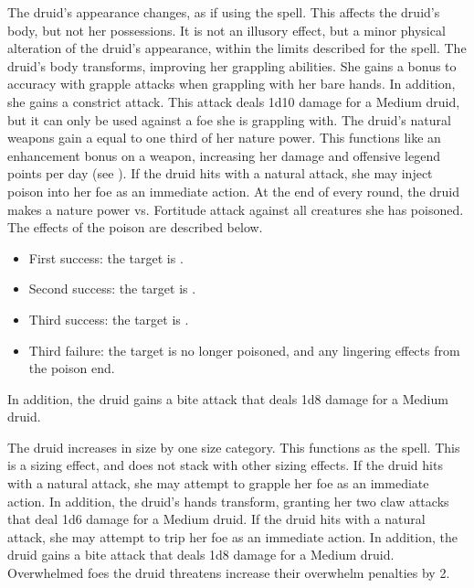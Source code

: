     The druid's appearance changes, as if using the  spell.
    This affects the druid's body, but not her possessions.
    It is not an illusory effect, but a minor physical alteration of the druid's appearance, within the limits described for the spell.
    The druid's body transforms, improving her grappling abilities.
    She gains a  bonus to accuracy with grapple attacks when grappling with her bare hands.
    In addition, she gains a constrict attack.
    This attack deals 1d10 damage for a Medium druid, but it can only be used against a foe she is grappling with.
    The druid's natural weapons gain a  equal to one third of her nature power.
    This functions like an enhancement bonus on a weapon, increasing her damage and offensive legend points per day (see ).
    If the druid hits with a natural attack, she may inject poison into her foe as an immediate action.
    At the end of every round, the druid makes a nature power vs. Fortitude attack against all creatures she has poisoned.
    The effects of the poison are described below.
    \begin{itemize}
        \item First success: the target is \sickened.
        \item Second success: the target is \staggered.
        \item Third success: the target is \nauseated.
        \item Third failure: the target is no longer poisoned, and any lingering effects from the poison end.
    \end{itemize}
    \par In addition, the druid gains a bite attack that deals 1d8 damage for a Medium druid.

    The druid increases in size by one size category.
    This functions as the  spell.
    This is a sizing effect, and does not stack with other sizing effects.
    If the druid hits with a natural attack, she may attempt to grapple her foe as an immediate action.
    In addition, the druid's hands transform, granting her two claw attacks that deal 1d6 damage for a Medium druid.
    If the druid hits with a natural attack, she may attempt to trip her foe as an immediate action.
    In addition, the druid gains a bite attack that deals 1d8 damage for a Medium druid.
    Overwhelmed foes the druid threatens increase their overwhelm penalties by 2.

